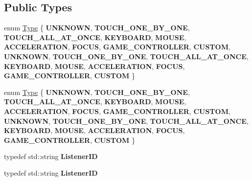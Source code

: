 \subsection*{Public Types}
\begin{DoxyCompactItemize}
\item 
enum \hyperlink{classEventListener_ab78e6acdfa2343490eda9e92d1555ee4}{Type} \{ \newline
{\bfseries U\+N\+K\+N\+O\+WN}, 
{\bfseries T\+O\+U\+C\+H\+\_\+\+O\+N\+E\+\_\+\+B\+Y\+\_\+\+O\+NE}, 
{\bfseries T\+O\+U\+C\+H\+\_\+\+A\+L\+L\+\_\+\+A\+T\+\_\+\+O\+N\+CE}, 
{\bfseries K\+E\+Y\+B\+O\+A\+RD}, 
\newline
{\bfseries M\+O\+U\+SE}, 
{\bfseries A\+C\+C\+E\+L\+E\+R\+A\+T\+I\+ON}, 
{\bfseries F\+O\+C\+US}, 
{\bfseries G\+A\+M\+E\+\_\+\+C\+O\+N\+T\+R\+O\+L\+L\+ER}, 
\newline
{\bfseries C\+U\+S\+T\+OM}, 
{\bfseries U\+N\+K\+N\+O\+WN}, 
{\bfseries T\+O\+U\+C\+H\+\_\+\+O\+N\+E\+\_\+\+B\+Y\+\_\+\+O\+NE}, 
{\bfseries T\+O\+U\+C\+H\+\_\+\+A\+L\+L\+\_\+\+A\+T\+\_\+\+O\+N\+CE}, 
\newline
{\bfseries K\+E\+Y\+B\+O\+A\+RD}, 
{\bfseries M\+O\+U\+SE}, 
{\bfseries A\+C\+C\+E\+L\+E\+R\+A\+T\+I\+ON}, 
{\bfseries F\+O\+C\+US}, 
\newline
{\bfseries G\+A\+M\+E\+\_\+\+C\+O\+N\+T\+R\+O\+L\+L\+ER}, 
{\bfseries C\+U\+S\+T\+OM}
 \}
\item 
enum \hyperlink{classEventListener_ab78e6acdfa2343490eda9e92d1555ee4}{Type} \{ \newline
{\bfseries U\+N\+K\+N\+O\+WN}, 
{\bfseries T\+O\+U\+C\+H\+\_\+\+O\+N\+E\+\_\+\+B\+Y\+\_\+\+O\+NE}, 
{\bfseries T\+O\+U\+C\+H\+\_\+\+A\+L\+L\+\_\+\+A\+T\+\_\+\+O\+N\+CE}, 
{\bfseries K\+E\+Y\+B\+O\+A\+RD}, 
\newline
{\bfseries M\+O\+U\+SE}, 
{\bfseries A\+C\+C\+E\+L\+E\+R\+A\+T\+I\+ON}, 
{\bfseries F\+O\+C\+US}, 
{\bfseries G\+A\+M\+E\+\_\+\+C\+O\+N\+T\+R\+O\+L\+L\+ER}, 
\newline
{\bfseries C\+U\+S\+T\+OM}, 
{\bfseries U\+N\+K\+N\+O\+WN}, 
{\bfseries T\+O\+U\+C\+H\+\_\+\+O\+N\+E\+\_\+\+B\+Y\+\_\+\+O\+NE}, 
{\bfseries T\+O\+U\+C\+H\+\_\+\+A\+L\+L\+\_\+\+A\+T\+\_\+\+O\+N\+CE}, 
\newline
{\bfseries K\+E\+Y\+B\+O\+A\+RD}, 
{\bfseries M\+O\+U\+SE}, 
{\bfseries A\+C\+C\+E\+L\+E\+R\+A\+T\+I\+ON}, 
{\bfseries F\+O\+C\+US}, 
\newline
{\bfseries G\+A\+M\+E\+\_\+\+C\+O\+N\+T\+R\+O\+L\+L\+ER}, 
{\bfseries C\+U\+S\+T\+OM}
 \}
\item 
\mbox{\label{classEventListener_a553816f1d89c3e2c29cdb6ec7130ea99}} 
typedef std\+::string {\bfseries Listener\+ID}
\item 
\mbox{\label{classEventListener_a553816f1d89c3e2c29cdb6ec7130ea99}} 
typedef std\+::string {\bfseries Listener\+ID}
\end{DoxyCompactItemize}
